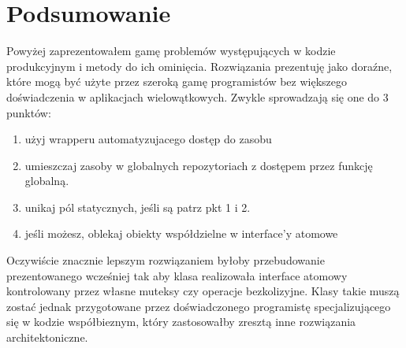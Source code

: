 \section{Podsumowanie}
Powyżej zaprezentowałem gamę problemów występujących w kodzie produkcyjnym i metody do ich ominięcia. Rozwiązania prezentuję jako doraźne, które mogą być użyte przez szeroką gamę programistów bez większego doświadczenia w aplikacjach wielowątkowych. Zwykle sprowadzają się one do 3 punktów:
\begin{enumerate}
\item użyj wrapperu  automatyzujacego dostęp do zasobu
\item umieszczaj zasoby w globalnych repozytoriach z dostępem przez funkcję globalną.
\item unikaj pól statycznych, jeśli są patrz pkt 1 i 2.
\item jeśli możesz, oblekaj obiekty współdzielne w interface'y atomowe
\end{enumerate}

Oczywiście znacznie lepszym rozwiązaniem byłoby przebudowanie prezentowanego wcześniej  tak aby klasa realizowała interface atomowy kontrolowany przez własne muteksy czy operacje bezkolizyjne. Klasy takie muszą zostać jednak przygotowane przez doświadczonego programistę specjalizującego się w kodzie współbieznym, który zastosowałby zresztą inne rozwiązania architektoniczne.
